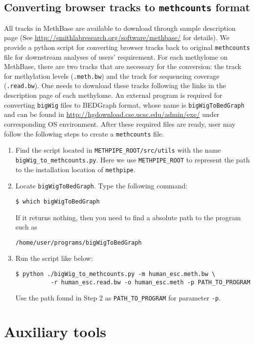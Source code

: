 \documentclass[10pt]{article}
\newcommand{\meth}{\texttt{methpipe}}
\newcommand{\prog}[1]{\texttt{#1}}
\begin{document}
{{\subsection{Converting browser tracks to \prog{methcounts} format}
All tracks in MethBase are available to download through sample description
page (See \url{http://smithlabresearch.org/software/methbase/} for details).
We provide a python script for converting browser tracks back to original
\texttt{methcounts} file for downstream analyses of users' requirement. For
each methylome on MethBase, there are two tracks that are necessary for
the conversion: the track for methylation levels (\texttt{.meth.bw}) and
the track for sequencing coverage (\texttt{.read.bw}). One needs to download
these tracks following the links in the description page of each methylome.
An external program is required for converting \texttt{bigWig} files to
BEDGraph format, whose name is \texttt{bigWigToBedGraph} and can be found
in \url{http://hgdownload.cse.ucsc.edu/admin/exe/} under corresponding
OS environment. After these required files are ready, user may follow the
following steps to create a \texttt{methcounts} file.

\begin{enumerate}
\item Find the script located in \texttt{METHPIPE\_ROOT/src/utils} with the
name \texttt{bigWig\_to\_methcounts.py}. Here we use
\texttt{METHPIPE\_ROOT} to represent the path to the installation location
of \meth.
\item Locate \texttt{bigWigToBedGraph}. Type the following command:
\begin{verbatim}
$ which bigWigToBedGraph
\end{verbatim}
If it returns nothing, then you need to find a absolute path to the
program such as
\begin{verbatim}
/home/user/programs/bigWigToBedGraph
\end{verbatim}
\item Run the script like below:
\begin{verbatim}
$ python ./bigWig_to_methcounts.py -m human_esc.meth.bw \
          -r human_esc.read.bw -o human_esc.meth -p PATH_TO_PROGRAM
\end{verbatim}
Use the path found in Step 2 as \texttt{PATH\_TO\_PROGRAM} for parameter
\texttt{-p}.

\end{enumerate}


\section{Auxiliary tools}
\label{sec:auxiliary-tools}

}}
\end{document}
